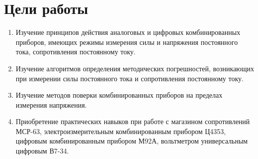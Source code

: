 \section{Цели работы}

\begin{enumerate}
  \item Изучение принципов действия аналоговых и цифровых комбинированных приборов, имеющих режимы измерения силы и напряжения постоянного тока, сопротивления постоянному току.
  \item Изучение алгоритмов определения методических погрешностей, возникающих при измерении силы постоянного тока и сопротивления постоянному току.
  \item Изучение методов поверки комбинированных приборов на пределах измерения напряжения.
  \item Приобретение практических навыков при работе с магазином сопротивлений МСР-63, электроизмерительным  комбинированным прибором Ц4353, цифровым  комбинированным прибором М92А, вольтметром универсальным цифровым В7-34. 
\end{enumerate}


